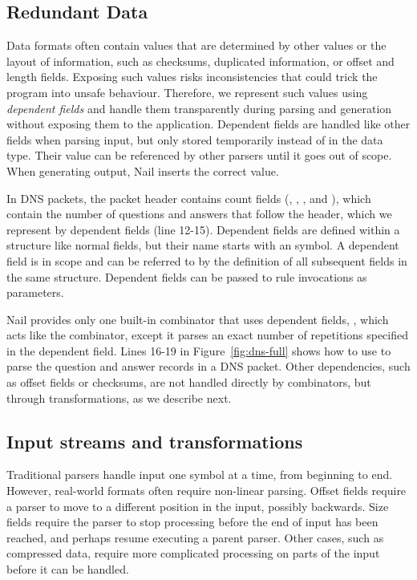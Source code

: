 \subsection{Redundant Data}
\label{s:dependent}
Data formats often contain values that are determined by other values or the layout of information,
such as checksums, duplicated information, or offset and  length fields. Exposing such values risks
inconsistencies that could trick the program into unsafe behaviour. Therefore, we represent such values using \emph{dependent fields} and handle them transparently during
parsing and generation without exposing them to the application. 
Dependent fields are handled like other fields when parsing input, but only stored temporarily
instead of in the data type. Their value can be referenced by other parsers until it goes out of scope.
When generating output, Nail inserts the correct value.

In DNS packets, the packet header contains count fields (,
, , and ), which contain the number of questions and answers that follow the
header, which we represent by dependent fields (line 12-15).
Dependent fields are defined within a structure like normal fields, but their name starts with an  symbol.
A dependent field is in scope and can be referred to by the definition of all subsequent fields in
the same structure. Dependent fields can be passed to rule invocations as parameters.

Nail provides only one built-in combinator that uses dependent fields, , which acts like
the  combinator, except it parses an exact number of repetitions specified in the dependent
field. Lines 16-19 in Figure~\ref{fig:dns-full} shows how to use  to parse the question and
answer records in a DNS packet.
Other dependencies, such as offset fields or checksums, are not handled directly by combinators, but
through  transformations, as we describe next.

\subsection{Input streams and transformations}
\label{s:transforms}

Traditional parsers handle input one symbol at a time, from beginning to end.
However, real-world formats often require non-linear parsing. Offset fields require a parser to move
to a different position in the input, possibly backwards. Size fields require the parser to stop
processing before the end of input has been reached, and perhaps resume executing a parent parser.
Other cases, such as compressed data, require more complicated processing on parts of the input
before it can be handled.

